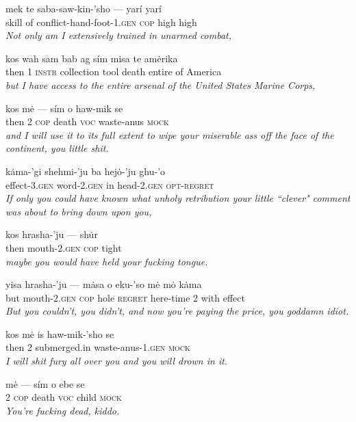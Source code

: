 \documentclass{article}[10pt]
\begin{document}
\begin{exe}
\ex
\gll mek te saba-saw-kin-'sho --- yar\'{i} yar\'{i}\\
skill of conflict-hand-foot-\textsc{1.gen} \textsc{cop} high high\\
\trans \emph{Not only am I extensively trained in unarmed combat,}

\ex
\gll kos wah sam bab ag s\'{i}m misa te am\.{e}rika\\
then 1 \textsc{instr} collection tool death entire of America\\
\trans \emph{but I have access to the entire arsenal of the United States Marine Corps,}

\ex
\gll kos m\.{e} --- s\'{i}m o haw-mik se\\
then 2 \textsc{cop} death \textsc{voc} waste-anus \textsc{mock}\\
\trans \emph{and I will use it to its full extent to wipe your miserable ass off the face of the continent, you little shit.}

\ex
\gll k\.{a}ma-'gi shehmi-'ju ba hej\.{o}-'ju ghu-'o\\
effect-\textsc{3.gen} word-\textsc{2.gen} in head-\textsc{2.gen} \textsc{opt}-\textsc{regret}\\
\trans \emph{If only you could have known what unholy retribution your little ``clever" comment was about to bring down upon you,}

\ex
\gll kos hrasha-'ju --- sh\.{u}r\\
then mouth-\textsc{2.gen} \textsc{cop} tight\\
\trans \emph{maybe you would have held your fucking tongue.}

\ex
\gll yisa hrasha-'ju --- m\.{a}sa o eku-'so m\.{e} m\.{o} k\.{a}ma\\
but mouth-\textsc{2.gen} \textsc{cop} hole \textsc{regret} here-time 2 with effect\\
\trans \emph{But you couldn't, you didn't, and now you're paying the price, you goddamn idiot.}

\ex
\gll kos m\.{e} is haw-mik-'sho se\\
then 2 submerged.in waste-anus-\textsc{1.gen} \textsc{mock}\\
\trans \emph{I will shit fury all over you and you will drown in it.}

\ex
\gll m\.{e} --- s\'{i}m o ebe se\\
2 \textsc{cop} death \textsc{voc} child \textsc{mock}\\
\trans \emph{You're fucking dead, kiddo.}
\end{exe}
\clearpage
\end{document}
